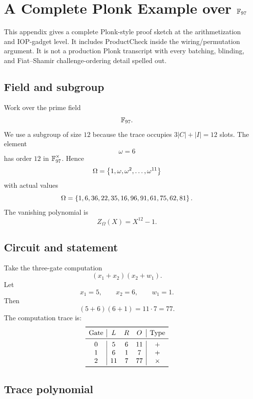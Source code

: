 ﻿\section{A Complete Plonk Example over \texorpdfstring{$\mathbb{F}_{97}$}{F97}}

This appendix gives a complete Plonk-style proof sketch at the arithmetization and IOP-gadget level. It includes ProductCheck inside the wiring/permutation argument. It is not a production Plonk transcript with every batching, blinding, and Fiat--Shamir challenge-ordering detail spelled out.

\subsection{Field and subgroup}

Work over the prime field
\[
    \mathbb{F}_{97}.
\]
We use a subgroup of size $12$ because the trace occupies $3|C|+|I|=12$ slots. The element
\[
    \omega=6
\]
has order $12$ in $\mathbb{F}_{97}^\times$. Hence
\[
    \Omega=\left\{1,\omega,\omega^2,\ldots,\omega^{11}\right\}
\]
with actual values
\[
    \Omega=\left\{1,6,36,22,35,16,96,91,61,75,62,81\right\}.
\]
The vanishing polynomial is
\[
    Z_\Omega(X)=X^{12}-1.
\]

\subsection{Circuit and statement}

Take the three-gate computation
\[
    (x_1+x_2)(x_2+w_1).
\]
Let
\[
    x_1=5,
    \qquad
    x_2=6,
    \qquad
    w_1=1.
\]
Then
\[
    (5+6)(6+1)=11\cdot7=77.
\]
The computation trace is:
\[
\begin{array}{c|ccc|c}
\toprule
\text{Gate} & L & R & O & \text{Type}\\
\midrule
0 & 5 & 6 & 11 & +\\
1 & 6 & 1 & 7 & +\\
2 & 11 & 7 & 77 & \times\\
\bottomrule
\end{array}
\]

\subsection{Trace polynomial}

